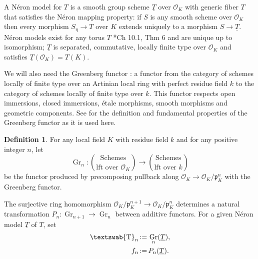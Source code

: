 \documentclass{amsart}
\theoremstyle{plain}
\theoremstyle{definition}
\newtheorem{definition}[theorem]{Definition}
\theoremstyle{remark}
\newcommand{\OK}{\mathcal{O}_K}
\newcommand{\pK}{\mathfrak{p}_K}
\newcommand{\Fq}{k}
\newcommand{\mathswab}[1]{\operatorname{\textswab{#1}}}
\newcommand{\GN}[1]{\mathswab{#1}}
\newcommand{\TT}{\underline{T}}
\DeclareMathOperator{\Gr}{Gr}
\newcommand{\ceq}{{\, :=\, }}
\newcommand{\partop}[2]{\genfrac{(}{)}{0pt}{0}{#1}{#2}}
\begin{document}
A N\'eron model for $T$ is a smooth group scheme $\TT$ over $\OK$ with generic fiber $T$
that satisfies the N\'eron mapping property: if $S$ is any smooth scheme over $\OK$ then every morphism
$S_\eta \to T$ over $K$ extends uniquely to a morphism $S \to \TT$.  N\'eron models exist for any torus
$T$ \cite{bosch-lutkebohmert-reynaud:NeronModels}*{Ch 10.1, Thm 6} and are unique up to isomorphism;
$\TT$ is separated, commutative, locally finite type over $\OK$ and satisfies $\TT(\OK) = T(K)$.

We will also need the Greenberg functor :
a functor from the category of schemes locally of finite type
over an Artinian local ring with perfect residue field $k$
to the category of schemes locally of finite type over $k$.
This functor respects open immersions, closed immersions, \'etale morphisms, smooth morphisms and geometric components.
See
for the definition and fundamental properties of the Greenberg functor as it is used here.

\begin{definition}\label{def:Grn}
For any local field $K$ with residue field $\Fq$ and for any positive integer $n$, let
\[
\Gr_n : \partop{\text{Schemes}}{\text{lft over $\OK$}} \to \partop{\text{Schemes}}{\text{lft over $\Fq$}}
\]
be the functor produced by precomposing pullback along $\OK \to \OK/\pK^n$ with the Greenberg functor.
\end{definition}

The surjective ring homomorphism $\OK/\pK^{n+1} \to \OK/\pK^n$ determines a
natural transformation $P_{n} : \Gr_{n+1} \to \Gr_n$ between additive functors.
For a given Néron model $\TT$ of $T$, set
\begin{align*}
 \GN{T}_n &\ceq \Gr_n(\TT), \\
 f_n &\ceq P_n(\TT).
\end{align*}
\end{document}
